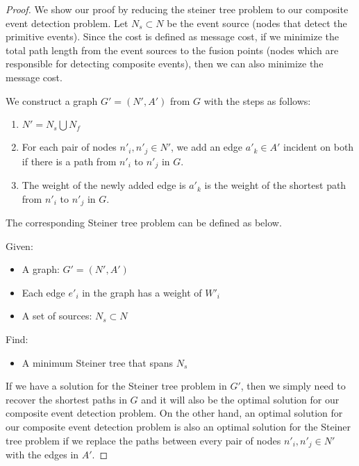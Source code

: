\begin{proof}
We show our proof by reducing the steiner tree problem to our composite event detection problem. Let \(N_s\subset N\) be the event source (nodes that detect the primitive events). Since the cost is defined as message cost, if we minimize the total path length from the event sources to the fusion points (nodes which are responsible for detecting composite events), then we can also minimize the message cost.

We construct a graph \(G'=(N', A')\) from \(G\) with the steps as follows:
\begin{enumerate}
\item \(N'=N_s\bigcup N_f\)
\item For each pair of nodes \(n'_i, n'_j\in N'\), we add an edge \(a'_k\in A'\) incident on both if there is a path from \(n'_i\) to \(n'_j\) in \(G\).
\item The weight of the newly added edge is \(a'_k\) is the weight of the shortest path from \(n'_i\) to \(n'_j\) in \(G\).
\end{enumerate}

The corresponding Steiner tree problem can be defined as below.

Given:
\begin{itemize}
\item A graph: \(G'=(N', A')\)
\item Each edge \(e'_i\) in the graph has a weight of \(W'_i\)
\item A set of sources: \(N_s\subset N\)
\end{itemize}

Find:
\begin{itemize}
\item A minimum Steiner tree that spans \(N_s\)
\end{itemize}

If we have a solution for the Steiner tree problem in \(G'\), then we simply need to recover the shortest paths in \(G\) and it will also be the optimal solution for our composite event detection problem. On the other hand, an optimal solution for our composite event detection problem is also an optimal solution for the Steiner tree problem if we replace the paths between every pair of nodes \(n'_i, n'_j\in N'\)  with the edges in \(A'\).
\end{proof}
